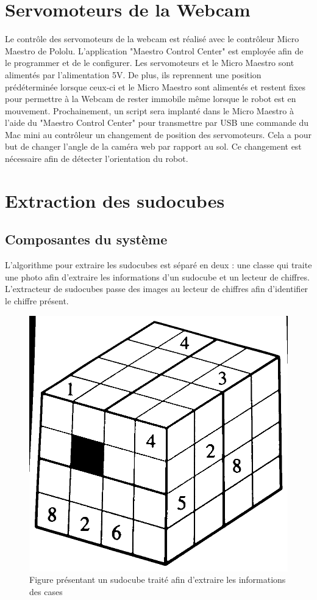 \section{Servomoteurs de la Webcam}
Le contrôle des servomoteurs de la webcam est réalisé avec le contrôleur Micro Maestro de Pololu. L'application "Maestro Control Center" est employée afin de le programmer et de le configurer. Les servomoteurs et le Micro Maestro sont alimentés par l'alimentation 5V. De plus, ils reprennent une position prédéterminée lorsque ceux-ci et le Micro Maestro sont alimentés et restent fixes pour permettre à la Webcam de rester immobile même lorsque le robot est en mouvement. Prochainement, un script sera implanté dans le Micro Maestro à l'aide du "Maestro Control Center" pour transmettre par USB une commande du Mac mini au contrôleur un changement de position des servomoteurs. Cela a pour but de changer l'angle de la caméra web par rapport au sol. Ce changement est nécessaire afin de détecter l'orientation du robot.

\section{Extraction des sudocubes}
\subsection{Composantes du système}
L'algorithme pour extraire les sudocubes est séparé en deux : une classe qui traite une photo afin d'extraire les informations d'un sudocube et un lecteur de chiffres. L'extracteur de sudocubes passe des images au lecteur de chiffres afin d'identifier le chiffre présent. 

\begin{figure}[htbp]
\centering
\includegraphics[scale=0.25]{fig/sudocubeThreshold.png}
\caption{Figure présentant un sudocube traité afin d'extraire les informations des cases}
\label{fig:sudoThresh}
\end{figure}


